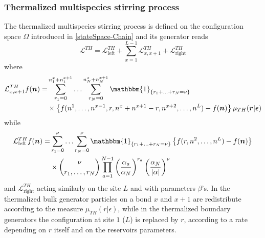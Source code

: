 \documentclass[10pt]{article}
\numberwithin{equation}{section}
\numberwithin{equation}{subsection}
\begin{document}
\subsubsection{Thermalized multispecies stirring process}
The thermalized multispecies stirring process is defined on the configuration space $\Omega$ introduced in \eqref{stateSpace-Chain} and its generator reads
\begin{equation}\label{thermalizedGenerator}
	\mathcal{L}^{TH}=\mathcal{L}_{\text{left}}^{TH}+\sum_{x=1}^{L-1}\mathcal{L}_{x,x+1}^{TH}+\mathcal{L}_{\text{right}}^{TH}
\end{equation}
where 
\begin{equation}\label{bulkThermalized}
	\begin{split}
	\mathcal{L}_{x,x+1}^{TH}f(\bm{n})=&\sum_{r_{1}=0}^{n_{1}^{x}+n_{1}^{x+1}}\ldots\sum_{r_{N}=0}^{n_{N}^{x}+n_{N}^{x+1}}\mathbbm{1}_{\{r_{1}+\ldots+r_{N}=\nu\}}
	\\&\times
	\left\{f(n^{1},\ldots,n^{x-1},r,n^{x}+n^{x+1}-r,n^{x+2},\ldots,n^{L})-f(\bm{n})\right\}\mu_{TH}(\bm{r}|\bm{\epsilon})
	\end{split}
\end{equation}
while
\begin{equation}\label{boundaryThermalized}
	\begin{split}
		\mathcal{L}_{\text{left}}^{TH}f(\bm{n})=&\sum_{r_{1}=0}^{\nu}\ldots\sum_{r_{N}=0}^{\nu}\mathbbm{1}_{\{r_{1}+\ldots+r_{N}=\nu\}}\left\{f(r,n^{2},\ldots,n^{L})-f(\bm{n})\right\}\\&\times
		\binom{\nu}{r_{1},\ldots, r_{N}}\prod_{a=1}^{N-1}\left(\frac{\alpha_{a}}{\alpha_{N}}\right)^{r_{a}}\left(\frac{\alpha_{N}}{|\alpha|}\right)^{\nu}
		\end{split}
	\end{equation}
and $\mathcal{L}_{\text{right}}^{TH}$ acting similarly on the site $L$ and with parameters $\beta$'s. 
In the thermalized bulk generator particles on a bond $x$ and $x+1$ are redistribute according to the measure $\mu_{TH}(r|\epsilon)$, while in the thermalized boundary generators the configuration at site $1$ ($L$) is replaced by $r$, according to a rate depending on $r$ itself and on the reservoirs parameters. 
\end{document}
